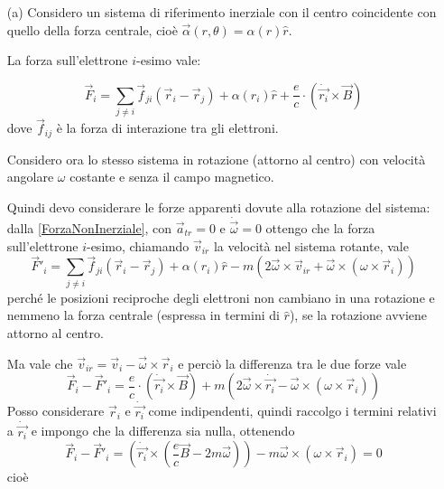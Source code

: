 \documentclass[../main.tex]{subfiles}
\begin{document}
  \solution
  \begin{itemize}
    \item[(a)]
    Considero un sistema di riferimento inerziale con il centro coincidente con quello della forza centrale, cio\`e $\vec \alpha(r, \theta)=\alpha(r)\hat r$.
    
    La forza sull'elettrone $i$-esimo vale:
    
    \begin{equation}
      \label{ecm:forzai}
      \vec F_i= \sum_{j \neq i} \vec f_{ji}(\vec r_i-\vec r_j)+\alpha(r_i)\hat r+\frac{e}{c} \cdot \left(\dot {\vec {r_i}} \times \vec B\right)
    \end{equation}
    dove $\vec f_{ij}$ \`e la forza di interazione tra gli elettroni.
    
    Considero ora lo stesso sistema in rotazione (attorno al centro) con velocit\`a angolare $\omega$ costante e senza il campo magnetico.
    
    Quindi devo considerare le forze apparenti dovute alla rotazione del sistema: dalla \cref{ForzaNonInerziale}, con $\vec a_{tr}=0$ e $\dot{\vec \omega}=0$ ottengo che la forza sull'elettrone $i$-esimo, chiamando $\vec v_{ir}$ la velocità nel sistema rotante, vale 
    \begin{equation}
      \label{ecm:forzar}
      \vec F'_i= \sum_{j \neq i} \vec f_{ji}(\vec r_i-\vec r_j)+\alpha(r_i)\hat r-m (2 \vec \omega \times \vec v_{ir}+ \vec \omega \times (\omega \times \vec r_i))
    \end{equation}
    perch\'e le posizioni reciproche degli elettroni non cambiano in una rotazione e nemmeno la forza centrale (espressa in termini di $\hat r$), se la rotazione avviene attorno al centro.
    
    Ma vale che $\vec v_{ir}=\vec v_i-\vec \omega\times \vec r_i$ e perciò la differenza tra le due forze vale
    \begin{equation}
      \label{ecm:diff}
      \vec F_i-\vec F'_i=\frac{e}{c} \cdot \left(\dot {\vec {r_i}} \times \vec B\right)+m (2 \vec \omega \times \dot {\vec {r_i}}- \vec \omega \times (\omega \times \vec r_i))
    \end{equation}
    Posso considerare $\vec r_i$ e $\dot {\vec{r_i}}$ come indipendenti, quindi raccolgo i termini relativi a $\dot {\vec{r_i}}$ e impongo che la differenza sia nulla, ottenendo
    \begin{equation}
      \label{ecm:diff0}
      \vec F_i-\vec F'_i=\left(\dot {\vec {r_i}} \times \left(\frac{e}{c} \vec B -2m\vec \omega\right)\right)- m \vec \omega \times (\omega \times \vec r_i)=0
    \end{equation}
    cio\`e
    

\end{itemize}
\end{document}
